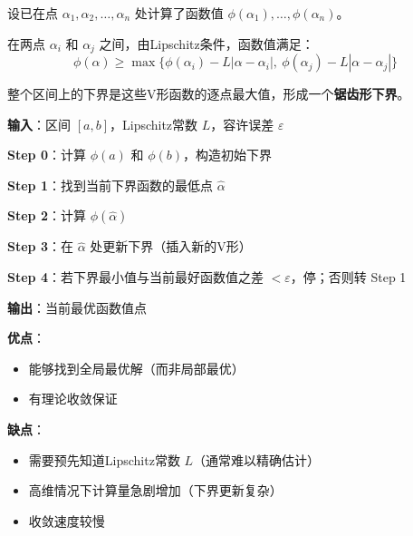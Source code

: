 设已在点 $\alpha_1, \alpha_2, \ldots, \alpha_n$ 处计算了函数值 $\phi(\alpha_1), \ldots, \phi(\alpha_n)$。

在两点 $\alpha_i$ 和 $\alpha_j$ 之间，由Lipschitz条件，函数值满足：
\[
\phi(\alpha) \geq \max\{\phi(\alpha_i) - L|\alpha - \alpha_i|,\ \phi(\alpha_j) - L|\alpha - \alpha_j|\}
\]

整个区间上的下界是这些V形函数的逐点最大值，形成一个\textbf{锯齿形下界}。

\begin{algobox}
\textbf{输入}：区间 $[a, b]$，Lipschitz常数 $L$，容许误差 $\varepsilon$

\textbf{Step 0}：计算 $\phi(a)$ 和 $\phi(b)$，构造初始下界

\textbf{Step 1}：找到当前下界函数的最低点 $\hat{\alpha}$

\textbf{Step 2}：计算 $\phi(\hat{\alpha})$

\textbf{Step 3}：在 $\hat{\alpha}$ 处更新下界（插入新的V形）

\textbf{Step 4}：若下界最小值与当前最好函数值之差 $< \varepsilon$，停；否则转 Step 1

\textbf{输出}：当前最优函数值点
\end{algobox}

\begin{notebox}
\textbf{优点}：
\begin{itemize}
    \item 能够找到全局最优解（而非局部最优）
    \item 有理论收敛保证
\end{itemize}

\textbf{缺点}：
\begin{itemize}
    \item 需要预先知道Lipschitz常数 $L$（通常难以精确估计）
    \item 高维情况下计算量急剧增加（下界更新复杂）
    \item 收敛速度较慢
\end{itemize}
\end{notebox}

